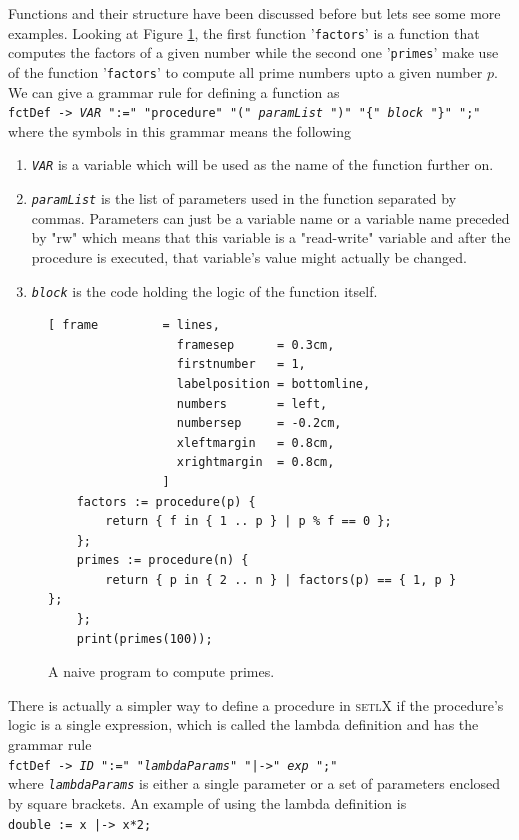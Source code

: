 \documentclass[11pt]{report}
\begin{document}
Functions and their structure have been discussed before but lets see some more examples. Looking at Figure \ref{fig:primes-slim.stlx}, the first function '\texttt{factors}' is a function that computes the factors of a given number while the second one '\texttt{primes}' make use of the function '\texttt{factors}' to compute all prime numbers upto a given number $p$. We can give a grammar rule for defining a function as
\\[0.2cm]
\hspace*{1.3cm}
\texttt{fctDef -> \textsl{VAR} ":=" "procedure" "(" \textsl{paramList} ")" "\{" \textsl{block} "\}" ";"}
\\[0.2cm]
where the symbols in this grammar means the following
\begin{enumerate}
\item \texttt{\textsl{VAR}} is a variable which will be used as the name of the function further on.
\item \texttt{\textsl{paramList}} is the list of parameters used in the function separated by commas. Parameters can just be a variable name or a variable name preceded by "rw" which means that this variable is a "read-write" variable and after the procedure is executed, that variable's value might actually be changed.
\item \texttt{\textsl{block}} is the code holding the logic of the function itself.
\end{enumerate}

\begin{figure}[!ht]
\centering
\begin{Verbatim}[ frame         = lines, 
                  framesep      = 0.3cm, 
                  firstnumber   = 1,
                  labelposition = bottomline,
                  numbers       = left,
                  numbersep     = -0.2cm,
                  xleftmargin   = 0.8cm,
                  xrightmargin  = 0.8cm,
                ]
    factors := procedure(p) {
        return { f in { 1 .. p } | p % f == 0 };
    };
    primes := procedure(n) {
        return { p in { 2 .. n } | factors(p) == { 1, p } };
    };
    print(primes(100));
\end{Verbatim}
\vspace*{-0.3cm}
\caption{A naive program to compute primes.}
\label{fig:primes-slim.stlx}
\end{figure}

There is actually a simpler way to define a procedure in \textsc{setlX} if the procedure's logic is a single expression, which is called the lambda definition and has the grammar rule
\\[0.2cm]
\hspace*{1.3cm}
\texttt{fctDef -> \textsl{ID} ":=" "\textsl{lambdaParams}" "|->" \textsl{exp} ";"}
\\[0.2cm]
where \texttt{\textsl{lambdaParams}} is either a single parameter or a set of parameters enclosed by square brackets. An example of using the lambda definition is
\\[0.2cm]
\hspace*{1.3cm}
\texttt{double := x |-> x*2;}
\\[0.2cm]
\\
\end{document}
